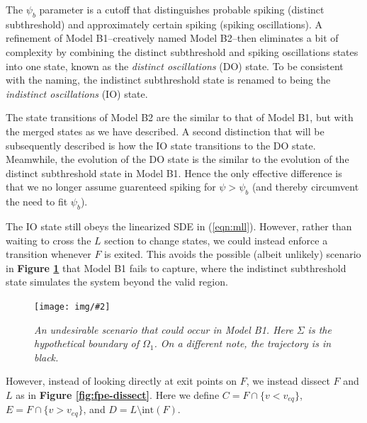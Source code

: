 \documentclass[letterpaper,12pt]{article}
\numberwithin{table}{section}
\numberwithin{figure}{section}
\numberwithin{equation}{section}
\newcommand{\centerfig}[2]{\begin{center}\texttt{[image: img/\#2]}\end{center}}
\newcommand{\ccaption}[1]{\caption{\textit{#1}}}
\newcommand{\reffig}[1]{\textbf{Figure \ref{#1}}}
\begin{document}
\begin{flushleft}

    The $\psi_b$ parameter is a cutoff that distinguishes probable spiking (distinct subthreshold) and approximately certain spiking (spiking oscillations). A refinement of Model B1--creatively named Model B2--then eliminates a bit of complexity by combining the distinct subthreshold and spiking oscillations states into one state, known as the \textit{distinct oscillations} (DO) state. To be consistent with the naming, the indistinct subthreshold state is renamed to being the \textit{indistinct oscillations} (IO) state.

    The state transitions of Model B2 are the similar to that of Model B1, but with the merged states as we have described. A second distinction that will be subsequently described is how the IO state transitions to the DO state. Meamwhile, the evolution of the DO state is the similar to the evolution of the distinct subthreshold state in Model B1. Hence the only effective difference is that we no longer assume guarenteed spiking for $\psi > \psi_b$ (and thereby circumvent the need to fit $\psi_b$).

    The IO state still obeys the linearized SDE in (\ref{eqn:mll}). However, rather than waiting to cross the $L$ section to change states, we could instead enforce a transition whenever $F$ is exited. This avoids the possible (albeit unlikely) scenario in \reffig{fig:modelb1-fpe-fail} that Model B1 fails to capture, where the indistinct subthreshold state simulates the system beyond the valid region.
    \begin{figure}[h]

        \centering
 
        \centerfig{0.8}{modelb1-fpe-fail.jpg}
    
        \captionsetup{width=0.85\linewidth}
        \ccaption{An undesirable scenario that could occur in Model B1. Here $\Sigma$ is the hypothetical boundary of $\Omega_1$. On a different note, the trajectory is in black.}
        \label{fig:modelb1-fpe-fail}
    
    \end{figure}

    However, instead of looking directly at exit points on $F$, we instead dissect $F$ and $L$ as in         \reffig{fig:fpe-dissect}. Here we define $C = F \cap \{v < v_{eq}\}$, $E = F \cap \{v > v_{eq}\}$, and $D = L \setminus \text{int}(F)$.
    \begin{figure}[h]


\end{figure}
\end{flushleft}
\end{document}
